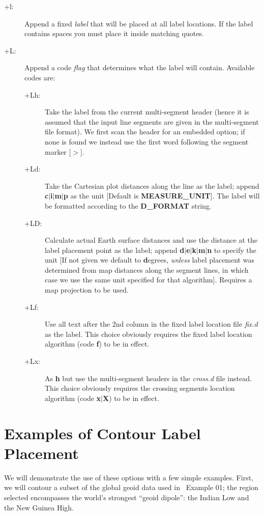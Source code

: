 \begin{description}
\item [+l:] Append a fixed {\it label} that will be placed at all label locations.  If the label contains
spaces you must place it inside matching quotes.
\item [+L:] Append a code {\it flag} that determines what the label will contain.  Available codes are:
\begin{description}
\item [+Lh:]  Take the label from the current multi-segment header (hence it is assumed that the
input line segments are given in the multi-segment file format).  We first scan the header for an embedded
 option; if none is found we instead use the first word following the segment marker [$>$].
\item [+Ld:] Take the Cartesian plot distances along the line as the label; append {\bf c$|$i$|$m$|$p}
as the unit [Default is {\bf MEASURE\_UNIT}].  The label will be formatted according to the {\bf D\_FORMAT}
string.
\item [+LD:]  Calculate actual Earth surface distances and use the distance at the label placement point as
the label; append {\bf d$|$e$|$k$|$m$|$n} to specify the unit [If not given we default to {\bf d}egrees,
\emph{unless} label placement was determined from map distances along the segment lines, in which case we
use the same unit specified for that algorithm].  Requires a map projection to be used.
\item [+Lf:]  Use all text after the 2nd column in the fixed label location file {\it fix.d} as the label.
This choice obviously requires the fixed label location algorithm (code {\bf f}) to be in effect.
\item [+Lx:]  As {\bf h} but use the multi-segment headers in the {\it cross.d} file instead.
This choice obviously requires the crossing segments location algorithm (code {\bf x$|$X}) to be in effect.
\end{description}
\end{description}

\section{Examples of Contour Label Placement}

We will demonstrate the use of these options with a few simple examples.
First, we will contour a subset of the global geoid data used in \GMT\ Example 01;
the region selected encompasses the world's strongest ``geoid dipole'': the Indian Low
and the New Guinea High.

